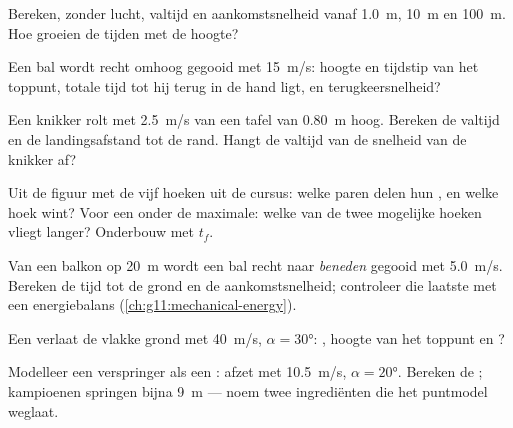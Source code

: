 \begin{exercise}[$\star$]\label{exo:g12:projectile-motion:3}
Bereken, zonder lucht, valtijd en aankomstsnelheid vanaf \qty{1.0}{m},
\qty{10}{m} en \qty{100}{m}. Hoe groeien de tijden met de hoogte?
\end{exercise}

\begin{exercise}[$\star$]\label{exo:g12:projectile-motion:4}
Een bal wordt recht omhoog gegooid met \qty{15}{m/s}: hoogte en tijdstip van
het toppunt, totale tijd tot hij terug in de hand ligt, en terugkeersnelheid?
\end{exercise}

\begin{exercise}[$\star$]\label{exo:g12:projectile-motion:5}
Een knikker rolt met \qty{2.5}{m/s} van een tafel van \qty{0.80}{m} hoog.
Bereken de valtijd en de landingsafstand tot de rand. Hangt de valtijd van de
snelheid van de knikker af?
\end{exercise}

\begin{exercise}[$\star\star$]\label{exo:g12:projectile-motion:6}
Uit de figuur met de vijf hoeken uit de cursus: welke paren  delen
hun , en welke hoek wint? Voor een  onder de maximale: welke van
de twee mogelijke hoeken vliegt langer? Onderbouw met $t_f$.
\end{exercise}

\begin{exercise}[$\star\star$]\label{exo:g12:projectile-motion:7}
Van een balkon op \qty{20}{m} wordt een bal recht naar \emph{beneden} gegooid
met \qty{5.0}{m/s}. Bereken de tijd tot de grond en de aankomstsnelheid;
controleer die laatste met een energiebalans
(\cref{ch:g11:mechanical-energy}).
\end{exercise}

\begin{exercise}[$\star\star$]\label{exo:g12:projectile-motion:8}
Een  verlaat de vlakke grond met \qty{40}{m/s},
$\alpha = \ang{30}$: , hoogte van het toppunt en ?
\end{exercise}

\begin{exercise}[$\star\star$]\label{exo:g12:projectile-motion:9}
Modelleer een verspringer als een : afzet met \qty{10.5}{m/s},
$\alpha = \ang{20}$. Bereken de ; kampioenen springen bijna \qty{9}{m}
--- noem twee ingrediënten die het puntmodel weglaat.
\end{exercise}

